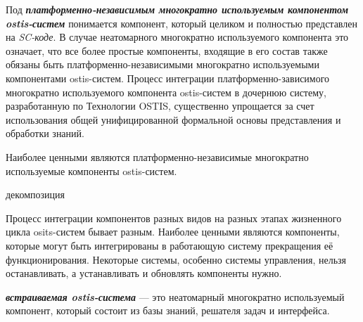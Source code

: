 Под \textbf{\textit{платформенно-независимым многократно используемым компонентом ostis-систем}} понимается компонент, который целиком и полностью представлен на \textit{SC-коде}. В случае неатомарного многократно используемого компонента это означает, что все более простые компоненты, входящие в его состав также обязаны быть платформенно-независимыми многократно используемыми компонентами ostis-систем. Процесс интеграции платформенно-зависимого многократно используемого компонента ostis-систем в дочернюю систему, разработанную по Технологии OSTIS, существенно упрощается за счет использования общей унифицированной формальной основы представления и обработки знаний.

Наиболее ценными являются платформенно-независимые многократно используемые компоненты ostis-систем.

\begin{SCn}
\begin{scnindent}
	\begin{scneqtoset}
		\begin{scnindent}
			\begin{scnrelfromset}{декомпозиция}
			\end{scnrelfromset}
		\end{scnindent}
	\end{scneqtoset}
\end{scnindent}
\end{SCn}

Процесс интеграции компонентов разных видов на разных этапах жизненного цикла osits-систем бывает разным. Наиболее ценными являются компоненты, которые могут быть интегрированы в работающую систему  прекращения её функционирования. Некоторые системы, особенно системы управления, нельзя останавливать, а устанавливать и обновлять компоненты нужно.

\textbf{\textit{встраиваемая ostis-система}} --- это неатомарный многократно используемый компонент, который состоит из базы знаний, решателя задач и интерфейса.

